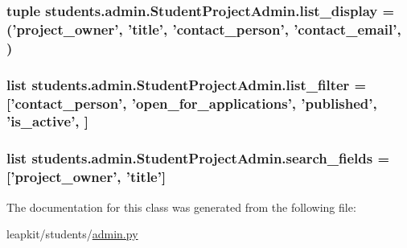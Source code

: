 \hypertarget{classstudents_1_1admin_1_1_student_project_admin_af38f3f1204fad4b8bdc1b4a7a3e71749}{
\subsubsection[{list\-\_\-display}]{\setlength{\rightskip}{0pt plus 5cm}tuple students.\-admin.\-Student\-Project\-Admin.\-list\-\_\-display = ('project\-\_\-owner', 'title', 'contact\-\_\-person', 'contact\-\_\-email', )\hspace{0.3cm}{\ttfamily [static]}}}\label{classstudents_1_1admin_1_1_student_project_admin_af38f3f1204fad4b8bdc1b4a7a3e71749}
\hypertarget{classstudents_1_1admin_1_1_student_project_admin_a2f15ee6b454237926ee185d9e84afce6}{
\subsubsection[{list\-\_\-filter}]{\setlength{\rightskip}{0pt plus 5cm}list students.\-admin.\-Student\-Project\-Admin.\-list\-\_\-filter = \mbox{[}'contact\-\_\-person', 'open\-\_\-for\-\_\-applications', 'published', 'is\-\_\-active', \mbox{]}\hspace{0.3cm}{\ttfamily [static]}}}\label{classstudents_1_1admin_1_1_student_project_admin_a2f15ee6b454237926ee185d9e84afce6}
\hypertarget{classstudents_1_1admin_1_1_student_project_admin_a48716676acc1e54867f4085bec1ae7e7}{
\subsubsection[{search\-\_\-fields}]{\setlength{\rightskip}{0pt plus 5cm}list students.\-admin.\-Student\-Project\-Admin.\-search\-\_\-fields = \mbox{[}'project\-\_\-owner', 'title'\mbox{]}\hspace{0.3cm}{\ttfamily [static]}}}\label{classstudents_1_1admin_1_1_student_project_admin_a48716676acc1e54867f4085bec1ae7e7}


The documentation for this class was generated from the following file\-:\begin{DoxyCompactItemize}
\item 
leapkit/students/\hyperlink{admin_8py}{admin.\-py}\end{DoxyCompactItemize}
